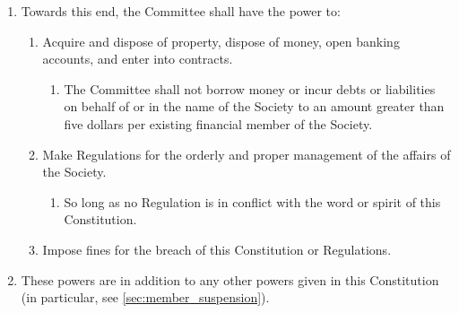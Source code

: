 \documentclass[a4paper]{article}
\begin{document}
\begin{enumerate}
    \item Towards this end, the Committee shall have the power to:
    \begin{enumerate}
        \item Acquire and dispose of property, dispose of money, open banking accounts, and enter into contracts.
        \begin{enumerate}
            \item The Committee shall not borrow money or incur debts or liabilities on behalf of or in the name of the Society to an amount greater than five dollars per existing financial member of the Society.
        \end{enumerate}
        \item Make Regulations for the orderly and proper management of the affairs of the Society.
        \begin{enumerate}
            \item So long as no Regulation is in conflict with the word or spirit of this Constitution.
        \end{enumerate}
        \item Impose fines for the breach of this Constitution or Regulations.
    \end{enumerate}
    \item These powers are in addition to any other powers given in this Constitution (in particular, see \cref{sec:member_suspension}).
\end{enumerate}
\end{document}
